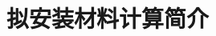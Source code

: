 
\title{\textbf{拟安装材料计算简介}}
\author[ ]{}   %
\renewcommand*{\Authfont}{\small\rm} %
\renewcommand*{\Affilfont}{\small\it} %
\renewcommand\Authands{ and } %
\renewcommand\Authands{ , } %
\date{} %


\maketitle

